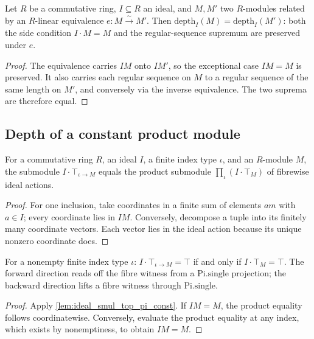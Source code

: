 \begin{lemma}\leanok
  \label{lem:depth_eq_of_linearEquiv}
  Let \(R\) be a commutative ring, \(I \subseteq R\) an ideal, and \(M, M'\) two
  \(R\)-modules related by an \(R\)-linear equivalence \(e : M \xrightarrow{\sim} M'\).
  Then \(\text{depth}_I(M) = \text{depth}_I(M')\): both the side condition
  \(I \cdot M = M\) and the regular-sequence supremum are preserved under \(e\).
\end{lemma}
\begin{proof}

\leanok
  The equivalence carries \(I M\) onto \(I M'\), so the exceptional
  case \(IM=M\) is preserved. It also carries each regular sequence on
  \(M\) to a regular sequence of the same length on \(M'\), and conversely
  via the inverse equivalence. The two suprema are therefore equal.
\end{proof}

\subsection{Depth of a constant product module}
\label{subsec:ab_depth_pi_substrate}

\begin{lemma}\leanok
  \label{lem:ideal_smul_top_pi_const}
  For a commutative ring \(R\), an ideal \(I\), a finite index type \(\iota\), and an
  \(R\)-module \(M\), the submodule \(I \cdot \top_{\iota \to M}\) equals the product
  submodule \(\prod_{\iota} (I \cdot \top_M)\) of fibrewise ideal actions.
\end{lemma}
\begin{proof}

\leanok
  For one inclusion, take coordinates in a finite sum of elements
  \(a m\) with \(a\in I\); every coordinate lies in \(IM\). Conversely,
  decompose a tuple into its finitely many coordinate vectors. Each vector
  lies in the ideal action because its unique nonzero coordinate does.
\end{proof}

\begin{lemma}\leanok
  \label{lem:ideal_smul_top_pi_const_eq_top_iff}
  For a nonempty finite index type \(\iota\): \(I \cdot \top_{\iota \to M} = \top\) if
  and only if \(I \cdot \top_M = \top\). The forward direction reads off the fibre
  witness from a \(\text{Pi.single}\) projection; the backward direction lifts a
  fibre witness through \(\text{Pi.single}\).
\end{lemma}
\begin{proof}

\leanok
  Apply \cref{lem:ideal_smul_top_pi_const}. If \(IM=M\), the product
  equality follows coordinatewise. Conversely, evaluate the product
  equality at any index, which exists by nonemptiness, to obtain \(IM=M\).
\end{proof}

